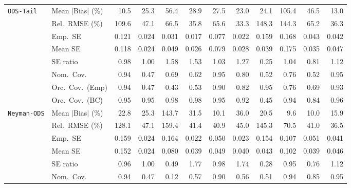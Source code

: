 \begin{landscape}
\begin{longtable}{llrrrrrrrrrr}
\addlinespace[2pt]
\quad \texttt{ODS-Tail} & Mean $|$Bias$|$ (\%) & \cellcolor{rankone}10.5 & 25.3 & 56.4 & 28.9 & 27.5 & \cellcolor{rankthree}23.0 & 24.1 & 105.4 & 46.5 & \cellcolor{ranktwo}13.0 \\
 & Rel.\ RMSE (\%) & 109.6 & 47.1 & 66.5 & \cellcolor{ranktwo}35.8 & 65.6 & \cellcolor{rankone}33.3 & 148.3 & 144.3 & 65.2 & \cellcolor{rankthree}36.3 \\
 & Emp.\ SE & 0.121 & 0.024 & 0.031 & 0.017 & 0.077 & 0.022 & 0.159 & 0.168 & 0.043 & 0.042 \\
 & Mean SE & 0.118 & 0.024 & 0.049 & 0.026 & 0.079 & 0.028 & 0.039 & 0.175 & 0.035 & 0.047 \\
 & SE ratio & \cellcolor{ranktwo}0.98 & \cellcolor{rankone}1.00 & 1.58 & 1.53 & \cellcolor{rankthree}1.03 & 1.27 & 0.25 & 1.04 & 0.81 & 1.12 \\
 & Nom.\ Cov. & \cellcolor{ranktwo}0.94 & 0.47 & 0.69 & 0.62 & \cellcolor{rankone}0.95 & \cellcolor{rankthree}0.80 & 0.52 & 0.76 & 0.52 & \cellcolor{rankone}0.95 \\
 & Orc.\ Cov.\ (Emp) & \cellcolor{ranktwo}0.94 & 0.47 & 0.43 & 0.53 & 0.90 & 0.82 & \cellcolor{rankone}0.95 & 0.76 & 0.69 & \cellcolor{rankthree}0.93 \\
 & Orc.\ Cov.\ (BC) & \cellcolor{rankone}0.95 & \cellcolor{rankone}0.95 & \cellcolor{rankthree}0.98 & \cellcolor{rankthree}0.98 & \cellcolor{rankone}0.95 & \cellcolor{rankthree}0.92 & 0.45 & \cellcolor{ranktwo}0.94 & 0.84 & \cellcolor{ranktwo}0.96 \\
\addlinespace[2pt]
\quad \texttt{Neyman-ODS} & Mean $|$Bias$|$ (\%) & 22.8 & 25.3 & 143.7 & 31.5 & \cellcolor{rankthree}10.1 & 36.0 & 20.5 & \cellcolor{rankone}9.6 & \cellcolor{ranktwo}10.0 & 15.9 \\
 & Rel.\ RMSE (\%) & 128.1 & 47.1 & 159.4 & 41.4 & \cellcolor{ranktwo}40.9 & 45.0 & 145.3 & 70.5 & \cellcolor{rankthree}41.0 & \cellcolor{rankone}36.5 \\
 & Emp.\ SE & 0.159 & 0.024 & 0.164 & 0.022 & 0.050 & 0.023 & 0.154 & 0.107 & 0.051 & 0.041 \\
 & Mean SE & 0.152 & 0.024 & 0.080 & 0.039 & 0.049 & 0.040 & 0.043 & 0.102 & 0.039 & 0.046 \\
 & SE ratio & \cellcolor{rankthree}0.96 & \cellcolor{rankone}1.00 & 0.49 & 1.77 & \cellcolor{ranktwo}0.98 & 1.74 & 0.28 & 0.95 & 0.76 & 1.12 \\
 & Nom.\ Cov. & \cellcolor{ranktwo}0.94 & 0.47 & 0.12 & 0.57 & \cellcolor{rankthree}0.90 & 0.56 & 0.51 & \cellcolor{ranktwo}0.94 & 0.85 & \cellcolor{rankone}0.95 \\

\end{longtable}
\end{landscape}
